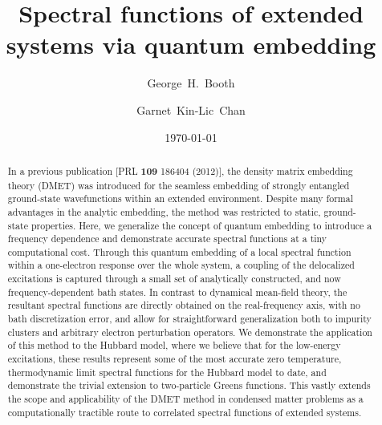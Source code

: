 \documentclass[aps,showpacs,twocolumn,nobibnotes]{revtex4}
\begin{document}
\title{Spectral functions of extended systems via quantum embedding}
\author{George~H.~Booth}
\author{Garnet~Kin-Lic~Chan}  

\begin{abstract}
In a previous publication [PRL {\bf 109} 186404 (2012)], the density matrix embedding theory (DMET) was introduced for the seamless embedding of
strongly entangled ground-state wavefunctions within an extended environment. 
Despite many formal advantages in the analytic embedding, the method was restricted to static, ground-state properties.
Here, we generalize the concept of quantum embedding to introduce a frequency dependence and demonstrate accurate spectral functions at a tiny
computational cost. Through this quantum embedding of a local spectral function within a one-electron response over the whole system, 
a coupling of the delocalized excitations is captured through a small set of 
analytically constructed, and now frequency-dependent bath states. In contrast to dynamical mean-field theory, the resultant 
spectral functions are directly obtained on the real-frequency axis, with no bath discretization error, and allow for straightforward generalization both 
to impurity clusters and arbitrary electron perturbation operators. We demonstrate
the application of this method to the Hubbard model, where we believe that for the low-energy excitations, these results represent some of the most accurate 
zero temperature, thermodynamic limit spectral functions for the Hubbard model to date, and demonstrate the trivial extension to two-particle Greens functions. 
This vastly extends the scope and applicability 
of the DMET method in condensed matter problems as a computationally tractible route to correlated spectral functions of extended systems.
\end{abstract}
\date{\today}
\maketitle
\end{document}

